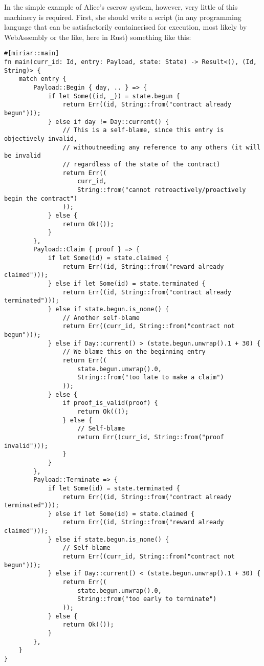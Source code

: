 \documentclass{extreport}
\begin{document}
In the simple example of Alice's escrow system, however, very little of this machinery is required. First, she should write a script (in any programming language that can be satisfactorily containerised for execution, most likely by WebAssembly or the like, here in Rust) something like this:

\begin{verbatim}
#[miriar::main]
fn main(curr_id: Id, entry: Payload, state: State) -> Result<(), (Id, String)> {
    match entry {
        Payload::Begin { day, .. } => {
            if let Some((id, _)) = state.begun {
                return Err((id, String::from("contract already begun")));
            } else if day != Day::current() {
                // This is a self-blame, since this entry is objectively invalid,
                // withoutneeding any reference to any others (it will be invalid
                // regardless of the state of the contract)
                return Err((
                    curr_id,
                    String::from("cannot retroactively/proactively begin the contract")
                ));
            } else {
                return Ok(());
            }
        },
        Payload::Claim { proof } => {
            if let Some(id) = state.claimed {
                return Err((id, String::from("reward already claimed")));
            } else if let Some(id) = state.terminated {
                return Err((id, String::from("contract already terminated")));
            } else if state.begun.is_none() {
                // Another self-blame
                return Err((curr_id, String::from("contract not begun")));
            } else if Day::current() > (state.begun.unwrap().1 + 30) {
                // We blame this on the beginning entry
                return Err((
                    state.begun.unwrap().0,
                    String::from("too late to make a claim")
                ));
            } else {
                if proof_is_valid(proof) {
                    return Ok(());
                } else {
                    // Self-blame
                    return Err((curr_id, String::from("proof invalid")));
                }
            }
        },
        Payload::Terminate => {
            if let Some(id) = state.terminated {
                return Err((id, String::from("contract already terminated")));
            } else if let Some(id) = state.claimed {
                return Err((id, String::from("reward already claimed")));
            } else if state.begun.is_none() {
                // Self-blame
                return Err((curr_id, String::from("contract not begun")));
            } else if Day::current() < (state.begun.unwrap().1 + 30) {
                return Err((
                    state.begun.unwrap().0,
                    String::from("too early to terminate")
                ));
            } else {
                return Ok(());
            }
        },
    }
}


\end{verbatim}
\end{document}
